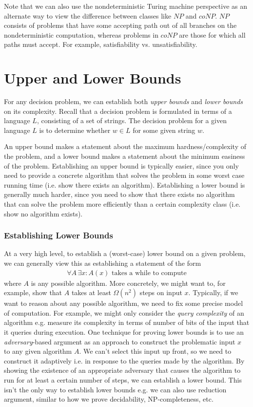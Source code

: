 \documentclass[10pt,a4paper]{article}
\begin{document}
Note that we can also use the nondeterministic Turing machine perspective as an alternate way to view the difference between classes like $NP$ and $coNP$. $NP$ consists of problems that have some accepting path out of all branches on the nondeterministic computation, whereas problems in $coNP$ are those for which all paths must accept. For example, satisfiability vs. unsatisfiability.


\section{Upper and Lower Bounds}


For any decision problem, we can establish both \textit{upper bounds} and \textit{lower bounds} on its complexity. Recall that a decision problem is formulated in terms of a language $L$, consisting of a set of strings. The decision problem for a given language $L$ is to determine whether $w \in L$ for some given string $w$.

An upper bound makes a statement about the maximum hardness/complexity of the problem, and a lower bound makes a statement about the minimum easiness of the problem. Establishing an upper bound is typically easier, since you only need to provide a concrete algorithm that solves the problem in some worst case running time (i.e. show there exists an algorithm). Establishing a lower bound is generally much harder, since you need to show that there exists no algorithm that can solve the problem more efficiently than a certain complexity class (i.e. show no algorithm exists). 

\subsubsection*{Establishing Lower Bounds}

At a very high level, to establish a (worst-case) lower bound on a given problem, we can generally view this as establishing a statement of the form 
\begin{align*}
    \forall A \, \exists x : A(x) \text{ takes a while to compute}
\end{align*}
where $A$ is any possible algorithm. More concretely, we might want to, for example, show that $A$ takes at least $\Omega(n^2)$ steps on input $x$. Typically, if we want to reason about any possible algorithm, we need to fix some precise model of computation. For example, we might only consider the \textit{query complexity} of an algorithm e.g. measure its complexity in terms of number of bits of the input that it queries during execution. One technique for proving lower bounds is to use an \textit{adversary}-based argument as an approach to construct the problematic input $x$ to any given algorithm $A$. We can't select this input up front, so we need to construct it adaptively i.e. in response to the queries made by the algorithm. By showing the existence of an appropriate adversary that causes the algorithm to run for at least a certain number of steps, we can establish a lower bound. This isn't the only way to establish lower bounds e.g. we can also use reduction argument, similar to how we prove decidability, NP-completeness, etc.
\end{document}
